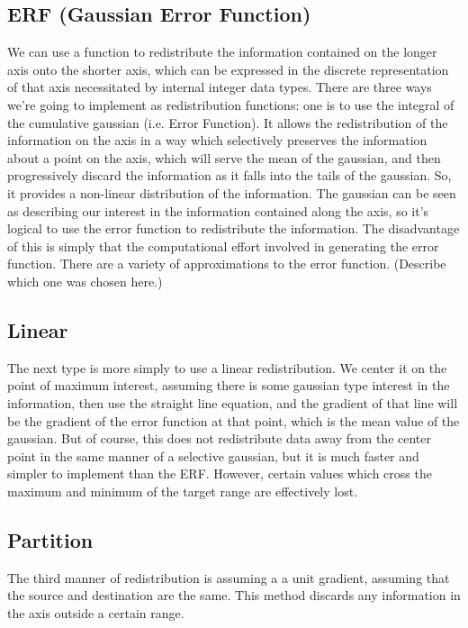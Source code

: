 \documentclass[10pt,a4paper]{article}
\begin{document}
\subsection{ERF (Gaussian Error Function)}\label{sec:ERF}
We can use a function to redistribute the information contained on the longer axis onto the shorter axis, which can be expressed in the discrete representation of that axis necessitated by internal integer data types. There are three ways we're going to implement as redistribution functions: one is to use the integral of the cumulative gaussian (i.e. Error Function). It allows the redistribution of the information on the axis in a way which selectively preserves the information about a point on the axis, which will serve the mean of the gaussian, and then progressively discard the information as it falls into the tails of the gaussian. So, it provides a non-linear distribution of the information. The gaussian can be seen as describing our interest in the information contained along the axis, so it's logical to use the error function to redistribute the information. The disadvantage of this is simply that the computational effort involved in generating the error function. There are a variety of approximations to the error function. (Describe which one was chosen here.)

\subsection{Linear}\label{sec:Linear}
The next type is more simply to use a linear redistribution. We center it on the point of maximum interest, assuming there is some gaussian type interest in the information, then use the straight line equation, and the gradient of that line will be the gradient of the error function at that point, which is the mean value of the gaussian. But of course, this does not redistribute data away from the center point in the same manner of a selective gaussian, but it is much faster and simpler to implement than the ERF. However, certain values which cross the maximum and minimum of the target range are effectively lost.

\subsection{Partition}\label{sec:Partition}
The third manner of redistribution is assuming a a unit gradient, assuming that the source and destination are the same. This method discards any information in the axis outside a certain range.
\end{document}
